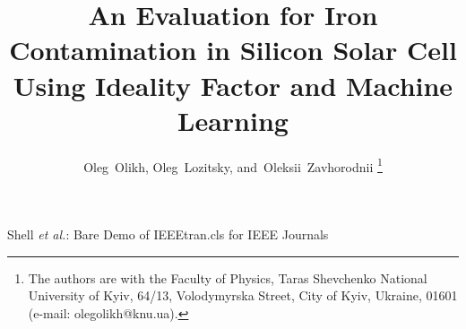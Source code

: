 \documentclass[journal]{IEEEtran}
\begin{document}
%
\title{An Evaluation for Iron Contamination in Silicon Solar Cell Using Ideality Factor and Machine Learning}
%
%
%

\author{Oleg~Olikh,
        Oleg~Lozitsky,
        and~Oleksii~Zavhorodnii%
\thanks{The authors are with the Faculty of Physics, Taras Shevchenko National University of Kyiv, 64/13, Volodymyrska Street, City of Kyiv, Ukraine, 01601 (e-mail: olegolikh@knu.ua).}}

%
%



%
{Shell \MakeLowercase{\textit{et al.}}: Bare Demo of IEEEtran.cls for IEEE Journals}
%
\end{document}
